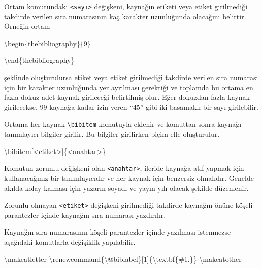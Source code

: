 \documentclass[
  letterpaper,
  DIV=11,
  numbers=noendperiod]{scrreprt}
\newenvironment{Shaded}{\begin{snugshade}}{\end{snugshade}}
\newcommand{\ExtensionTok}[1]{\textcolor[rgb]{0.00,0.23,0.31}{#1}}
\newcommand{\FunctionTok}[1]{\textcolor[rgb]{0.28,0.35,0.67}{#1}}
\newcommand{\KeywordTok}[1]{\textcolor[rgb]{0.00,0.23,0.31}{#1}}
\newcommand{\NormalTok}[1]{\textcolor[rgb]{0.00,0.23,0.31}{#1}}
\begin{document}
Ortam komutundaki \texttt{\textless{}sayı\textgreater{}} değişkeni,
kaynağın etiketi veya etiket girilmediği takdirde verilen sıra
numarasının kaç karakter uzunluğunda olacağını belirtir. Örneğin ortam

\begin{Shaded}
\begin{Highlighting}[]
\KeywordTok{\textbackslash{}begin}\NormalTok{\{}\ExtensionTok{thebibliography}\NormalTok{\}\{9\}}
        
\KeywordTok{\textbackslash{}end}\NormalTok{\{}\ExtensionTok{thebibliography}\NormalTok{\}}
\end{Highlighting}
\end{Shaded}

şeklinde oluşturulursa etiket veya etiket girilmediği takdirde verilen
sıra numarası için bir karakter uzunluğunda yer ayrılması gerektiği ve
toplamda bu ortama en fazla dokuz adet kaynak girileceği belirtilmiş
olur. Eğer dokuzdan fazla kaynak girilecekse, 99 kaynağa kadar izin
veren ``45'' gibi iki basamaklı bir sayı girilebilir.

Ortama her kaynak \texttt{\textbackslash{}bibitem} komutuyla eklenir ve
komuttan sonra kaynağı tanımlayıcı bilgiler girilir. Bu bilgiler
girilirken biçim elle oluşturulur.

\begin{Shaded}
\begin{Highlighting}[]
\FunctionTok{\textbackslash{}bibitem}\NormalTok{[\textless{}etiket\textgreater{}]\{\textless{}anahtar\textgreater{}\}}
\end{Highlighting}
\end{Shaded}

Komutun zorunlu değişkeni olan
\texttt{\textless{}anahtar\textgreater{}}, ileride kaynağa atıf yapmak
için kullanacağınız bir tanımlayıcıdır ve her kaynak için benzersiz
olmalıdır. Genelde akılda kolay kalması için yazarın soyadı ve yayın
yılı olacak şekilde düzenlenir.

Zorunlu olmayan \texttt{\textless{}etiket\textgreater{}} değişkeni
girilmediği takdirde kaynağın önüne köşeli parantezler içinde kaynağın
sıra numarası yazdırılır.

Kaynağın sıra numarasının köşeli parantezler içinde yazılması istenmezse
aşağıdaki komutlarla değişiklik yapılabilir.

\begin{Shaded}
\begin{Highlighting}[]
\FunctionTok{\textbackslash{}makeatletter}
\FunctionTok{\textbackslash{}renewcommand}\NormalTok{\{}\ExtensionTok{\textbackslash{}@biblabel}\NormalTok{\}[1]\{}\FunctionTok{\textbackslash{}textbf}\NormalTok{\{\#1.\}\}}
\FunctionTok{\textbackslash{}makeatother}
\end{Highlighting}
\end{Shaded}
\end{document}

